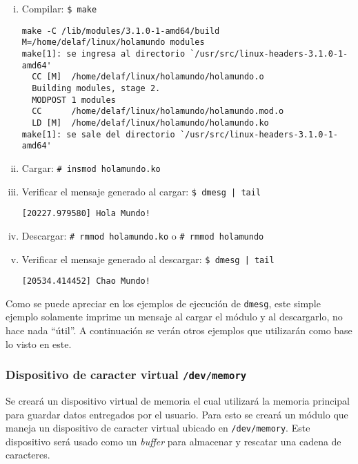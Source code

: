 \begin{enumerate}[i.]

\item Compilar: \texttt{\$ make}
\begin{verbatim}
make -C /lib/modules/3.1.0-1-amd64/build M=/home/delaf/linux/holamundo modules
make[1]: se ingresa al directorio `/usr/src/linux-headers-3.1.0-1-amd64'
  CC [M]  /home/delaf/linux/holamundo/holamundo.o
  Building modules, stage 2.
  MODPOST 1 modules
  CC      /home/delaf/linux/holamundo/holamundo.mod.o
  LD [M]  /home/delaf/linux/holamundo/holamundo.ko
make[1]: se sale del directorio `/usr/src/linux-headers-3.1.0-1-amd64'
\end{verbatim}

\item Cargar: \texttt{\# insmod holamundo.ko}

\item Verificar el mensaje generado al cargar: \texttt{\$ dmesg | tail}
\begin{verbatim}
[20227.979580] Hola Mundo!
\end{verbatim}

\item Descargar: \texttt{\# rmmod holamundo.ko} o \texttt{\# rmmod holamundo}

\item Verificar el mensaje generado al descargar: \texttt{\$ dmesg | tail}
\begin{verbatim}
[20534.414452] Chao Mundo!
\end{verbatim}

\end{enumerate}

Como se puede apreciar en los ejemplos de ejecución de \texttt{dmesg}, este simple ejemplo solamente imprime un mensaje al cargar el módulo y al descargarlo, no hace nada ``útil''. A continuación se verán otros ejemplos que utilizarán como base lo visto en este.

\subsubsection{Dispositivo de caracter virtual \texttt{/dev/memory}}

Se creará un dispositivo virtual de memoria el cual utilizará la memoria principal para guardar datos entregados por el usuario. Para esto se creará un módulo que maneja un dispositivo de caracter virtual ubicado en \texttt{/dev/memory}. Este dispositivo será usado como un \textit{buffer} para almacenar y rescatar una cadena de caracteres.

